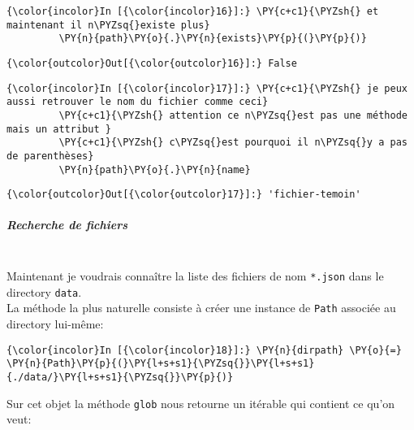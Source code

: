     \begin{Verbatim}[commandchars=\\\{\}]
{\color{incolor}In [{\color{incolor}16}]:} \PY{c+c1}{\PYZsh{} et maintenant il n\PYZsq{}existe plus}
         \PY{n}{path}\PY{o}{.}\PY{n}{exists}\PY{p}{(}\PY{p}{)}
\end{Verbatim}


\begin{Verbatim}[commandchars=\\\{\}]
{\color{outcolor}Out[{\color{outcolor}16}]:} False
\end{Verbatim}
            
    \begin{Verbatim}[commandchars=\\\{\}]
{\color{incolor}In [{\color{incolor}17}]:} \PY{c+c1}{\PYZsh{} je peux aussi retrouver le nom du fichier comme ceci}
         \PY{c+c1}{\PYZsh{} attention ce n\PYZsq{}est pas une méthode mais un attribut }
         \PY{c+c1}{\PYZsh{} c\PYZsq{}est pourquoi il n\PYZsq{}y a pas de parenthèses}
         \PY{n}{path}\PY{o}{.}\PY{n}{name}
\end{Verbatim}


\begin{Verbatim}[commandchars=\\\{\}]
{\color{outcolor}Out[{\color{outcolor}17}]:} 'fichier-temoin'
\end{Verbatim}
            
    \hypertarget{recherche-de-fichiers}{%
\subparagraph{Recherche de fichiers\\\\}\label{recherche-de-fichiers}}

    Maintenant je voudrais connaître la liste des fichiers de nom
\texttt{*.json} dans le directory \texttt{data}.\\

La méthode la plus naturelle consiste à créer une instance de
\texttt{Path} associée au directory lui-même:

    \begin{Verbatim}[commandchars=\\\{\}]
{\color{incolor}In [{\color{incolor}18}]:} \PY{n}{dirpath} \PY{o}{=} \PY{n}{Path}\PY{p}{(}\PY{l+s+s1}{\PYZsq{}}\PY{l+s+s1}{./data/}\PY{l+s+s1}{\PYZsq{}}\PY{p}{)}
\end{Verbatim}


    Sur cet objet la méthode \texttt{glob} nous retourne un itérable qui
contient ce qu'on veut:

